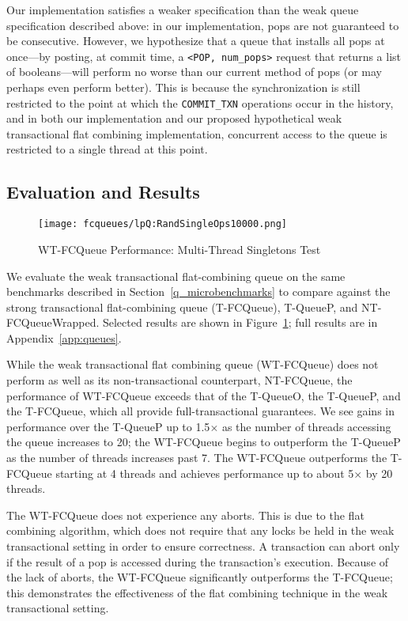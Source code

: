 Our implementation satisfies a weaker specification than the weak queue specification described above: in our implementation, pops are not guaranteed to be consecutive. However, we hypothesize that a queue that installs all pops at once---by posting, at commit time, a \texttt{<POP, num\_pops>} request that returns a list of booleans---will perform no worse than our current method of pops (or may perhaps even perform better). This is because the synchronization is still restricted to the point at which the \texttt{COMMIT\_TXN} operations occur in the history, and in both our implementation and our proposed hypothetical weak transactional flat combining implementation, concurrent access to the queue is restricted to a single thread at this point.

\subsection{Evaluation and Results}

\begin{figure}[t]
    \centering
    {\texttt{[image: fcqueues/lpQ:RandSingleOps10000.png]}}
    \caption{WT-FCQueue Performance: Multi-Thread Singletons Test}
    \label{fig:wtqs}
\end{figure}

We evaluate the weak transactional flat-combining queue on the same benchmarks described in Section~\ref{q_microbenchmarks} to compare against the strong transactional flat-combining queue (T-FCQueue), T-QueueP, and NT-FCQueueWrapped. Selected results are shown in Figure~\ref{fig:wtqs}; full results are in Appendix~\ref{app:queues}. 

While the weak transactional flat combining queue (WT-FCQueue) does not perform as well as its non-transactional counterpart, NT-FCQueue, the performance of WT-FCQueue exceeds that of the T-QueueO, the T-QueueP, and the T-FCQueue, which all provide full-transactional guarantees. We see gains in performance over the T-QueueP up to 1.5$\times$ as the number of threads accessing the queue increases to 20; the WT-FCQueue begins to outperform the T-QueueP as the number of threads increases past 7. The WT-FCQueue outperforms the T-FCQueue starting at 4 threads and achieves performance up to about 5$\times$ by 20 threads.
 
The WT-FCQueue does not experience any aborts. This is due to the flat combining algorithm, which does not require that any locks be held in the weak transactional setting in order to ensure correctness. A transaction can abort only if the result of a pop is accessed during the transaction's execution.
Because of the lack of aborts, the WT-FCQueue significantly outperforms the T-FCQueue; this demonstrates the effectiveness of the flat combining technique in the weak transactional setting. 

